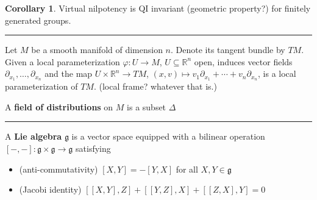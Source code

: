 \documentclass[12pt]{article}
\newcommand{\keyword}[1]{\textbf{#1}}
\newcommand{\sepline}{\rule{\textwidth}{0.4pt}}
\theoremstyle{definition}
\newtheorem{corollary}{Corollary}
\newcommand{\R}{\mathbb{R}}
\renewcommand{\gg}{\mathfrak{g}}
\renewcommand{\phi}{\varphi}
\newcommand{\<}{\left\langle}
\renewcommand{\>}{\right\rangle}
\newcommand{\seq}{\subseteq}
\begin{document}
\begin{corollary}
    Virtual nilpotency is QI invariant (geometric property?) for finitely generated groups.
\end{corollary}


\newpage
\sepline

Let $M$ be a smooth manifold of dimension $n$.
Denote its tangent bundle by $TM$.
Given a local parameterization $\phi : U \to M$, $U \seq \R^n$ open, induces vector fields $\partial_{x_1}, \dots, \partial_{x_n}$ and the map $U \times \R^n \to TM$, $(x, v) \mapsto v_1 \partial_{x_1} + \cdots + v_n \partial_{x_n}$, is a local parameterization of $TM$.
(local frame? whatever that is.)

A \keyword{field of distributions} on $M$ is a subset $\Delta$


\sepline

A \keyword{Lie algebra} $\gg$ is a vector space equipped with a bilinear operation $[-, -] : \gg \times \gg \to \gg$ satisfying
\begin{itemize}
    \item (anti-commutativity) $[X, Y] = -[Y, X]$ for all $X, Y \in \gg$
    \item (Jacobi identity) $[[X, Y], Z] + [[Y, Z], X] + [[Z, X], Y] = 0$
\end{itemize}
\end{document}
